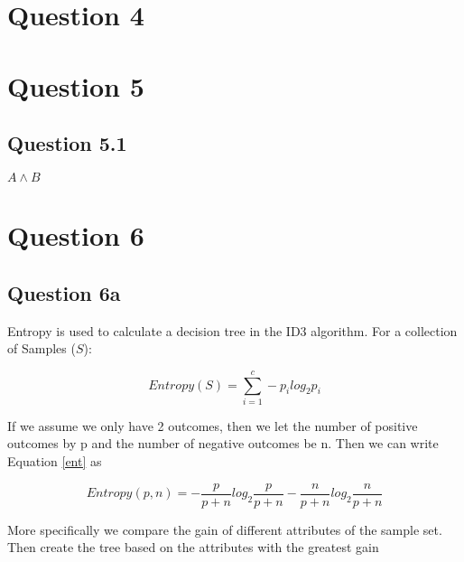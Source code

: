 \documentclass[10pt,a4paper]{article}
\begin{document}
\section{Question 4}
\section{Question 5}
\subsection{Question 5.1}
$A\wedge B$




\section{Question 6}
\subsection{Question 6a}

Entropy is used to calculate a decision tree in the ID3 algorithm. For a collection of Samples ($S$):

\begin{equation}
\label{ent}
Entropy(S) = \sum_{i=1}^c -p_i log_2p_i
\end{equation}

If we assume we only have 2 outcomes, then we let the number of positive outcomes by p and the number of negative outcomes be n. Then we can write Equation \ref{ent} as

\begin{equation}
Entropy(p,n) = -\frac{p}{p+n}log_2\frac{p}{p+n} - \frac{n}{p+n}log_2\frac{n}{p+n} 
\end{equation}
 
More specifically we compare the gain of different attributes of the sample set. Then create the tree based on the attributes with the greatest gain
\end{document}
